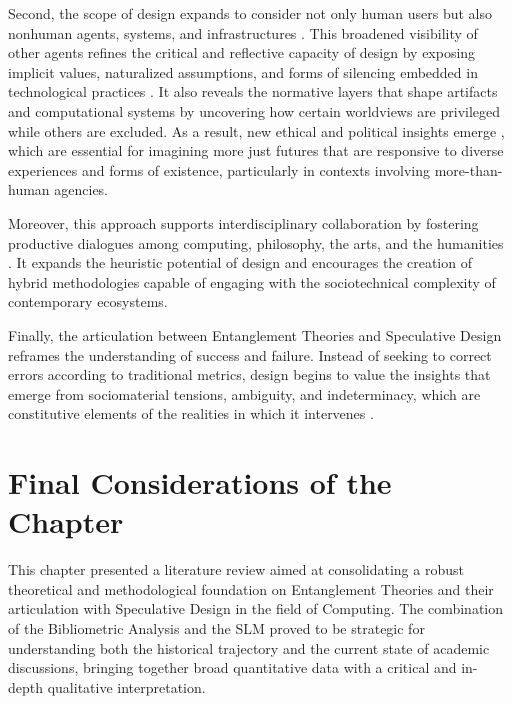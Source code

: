 Second, the scope of design expands to consider not only human users but also nonhuman agents, systems, and infrastructures \cite{forlano2023speculative, bekker2023challenges}. This broadened visibility of other agents refines the critical and reflective capacity of design by exposing implicit values, naturalized assumptions, and forms of silencing embedded in technological practices \cite{bekker2023challenges, forlano2023speculative, wakkary2022two}. It also reveals the normative layers that shape artifacts and computational systems by uncovering how certain worldviews are privileged while others are excluded. As a result, new ethical and political insights emerge \cite{homewood2021tracing, henry2024theorizing}, which are essential for imagining more just futures that are responsive to diverse experiences and forms of existence, particularly in contexts involving more-than-human agencies.

Moreover, this approach supports interdisciplinary collaboration by fostering productive dialogues among computing, philosophy, the arts, and the humanities \cite{calderwood2024designing, dorrenbacher2023intricacies}. It expands the heuristic potential of design and encourages the creation of hybrid methodologies capable of engaging with the sociotechnical complexity of contemporary ecosystems.

Finally, the articulation between Entanglement Theories and Speculative Design reframes the understanding of success and failure. Instead of seeking to correct errors according to traditional metrics, design begins to value the insights that emerge from sociomaterial tensions, ambiguity, and indeterminacy, which are constitutive elements of the realities in which it intervenes \cite{kimura2022designing, forlano2023speculative}.

\section{Final Considerations of the Chapter}

This chapter presented a literature review aimed at consolidating a robust theoretical and methodological foundation on Entanglement Theories and their articulation with Speculative Design in the field of Computing. The combination of the Bibliometric Analysis and the SLM proved to be strategic for understanding both the historical trajectory and the current state of academic discussions, bringing together broad quantitative data with a critical and in-depth qualitative interpretation.

